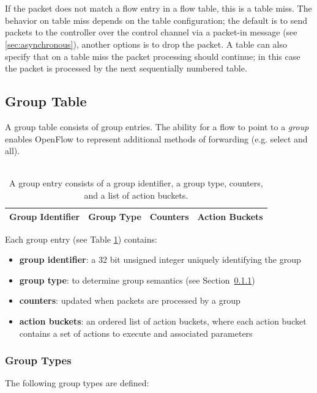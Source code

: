 \documentclass[10pt]{article}
\begin{document}
\\\\
If the packet does not match a flow entry in a flow table, this is a table miss. The behavior on table miss depends on the table configuration; the default is to send packets to the controller over the control channel via a packet-in message (see \ref{sec:asynchronous}), another options is to drop the packet. A table can also specify that on a table miss the packet processing should continue; in this case the packet is processed by the next sequentially numbered table.

\subsection{Group Table}
\label{sec:group table}
A group table consists of group entries.  The ability for a flow to point to a \emph{group} enables OpenFlow to represent additional methods of forwarding (e.g. select and all).
\\\\
\begin{table}[hbp]
\centering
\begin{tabular}{|c|c|c|c|}
\hline
Group Identifier & Group Type & Counters & Action Buckets\\
\hline
\end{tabular}
\caption{A group entry consists of a group identifier, a group type, counters, and a list of action buckets.}
\label{table:group entry}
\end{table}
Each group entry (see Table \ref{table:group entry}) contains:
\begin{itemize}
\item \textbf{group identifier}: a 32 bit unsigned integer uniquely identifying the group
\item \textbf{group type}: to determine group semantics (see Section~\ref{sec:group types})
\item \textbf{counters}: updated when packets are processed by a group
\item \textbf{action buckets}: an ordered list of action buckets, where each action bucket contains a set of actions to execute and associated parameters
\end{itemize}

\subsubsection{Group Types}
\label{sec:group types}
The following group types are defined:
\end{document}
